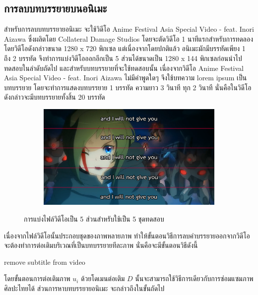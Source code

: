 \documentclass[hidelinks, a4paper,12pt]{article}
\numberwithin{equation}{section}							%
\numberwithin{equation}{section}
\begin{document}
{	
	
	\subsection{การลบบทบรรยายบนอนิเมะ}
	\hspace{1cm} สำหรับการลบบทบรรยายอนิเมะ จะใช้วิดีโอ Anime Festival Asia Special Video - feat. Inori Aizawa ซึ่งผลิตโดย Collateral Damage Studios โดยจะตัดวิดีโอ 1 นาทีแรกสำหรับการทดลอง โดยวิดีโอดังกล่าวขนาด 1280 x 720 พิกเซล แต่เนื่องจากโดยปกติแล้ว อนิเมะมักมีบรรทัดเพียง 1 ถึง 2 บรรทัด จึงทำการแบ่งวิดีโอออกอีกเป็น 5 ส่วนได้ขนาดเป็น 1280 x 144 พิกเซลก่อนนำไปทดสอบในลำดับถัดไป
	\hspace{1cm} และสำหรับบทบรรยายที่จะใช้ทดสอบนั้น เนื่องจากวิดีโอ Anime Festival Asia Special Video - feat. Inori Aizawa ไม่มีคำพูดใดๆ จึงใช้บทความ lorem ipsum เป็นบทบรรยาย โดยจะทำการแสดงบทบรรยาย 1 บรรทัด ความยาว 3 วินาที ทุก 2 วินาที นั่นคือในวิดีโอดังกล่าวจะมีบทบรรยายทั้งสิ้น 20 บรรทัด	
	
	\begin{figure}[H]
		\centering
		\begin{subfigure}{0.8\linewidth}
			\centering
			\includegraphics[width=0.8\linewidth]{images/inori-subbed-preview.png}
		\end{subfigure}
		\caption{การแบ่งไฟล์วิดีโอเป็น 5 ส่วนสำหรับใช้เป็น 5 ชุดทดสอบ}
	\end{figure}
	
	\hspace{1cm}เนื่องจากไฟล์วิดีโอนั้นประกอบชุดของภาพหลายภาพ ทำให้ขั้นตอนวิธีการลบคำบรรยายออกจากวิดีโอ จะต้องทำการต่อเติมบริเวณที่เป็นบทบรรยายทีละภาพ นั่นคือจะมีขั้นตอนวิธีดังนี้ \\
	
	\begin{algorithm}[H]
		\caption{remove subtitle from video}	
	\end{algorithm}
	\vspace{1cm}
	\hspace{1cm} โดยขั้นตอนการต่อเติมภาพ $u_i$ ด้วยโดเมนต่อเติม $D$ นั้นจะสามารถใช้วิธีการเดียวกับการซ่อมแซมภาพศิลปะไทยได้ ส่วนการหาบทบรรยายอนิเมะ จะกล่าวถึงในขั้นถัดไป
	
}
\end{document}
